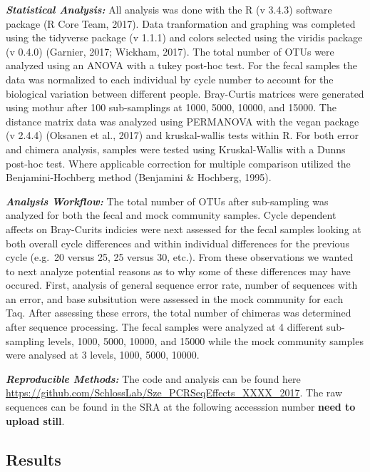 \documentclass[12pt,]{article}
\begin{document}
\textbf{\emph{Statistical Analysis:}} All analysis was done with the R
(v 3.4.3) software package (R Core Team, 2017). Data tranformation and
graphing was completed using the tidyverse package (v 1.1.1) and colors
selected using the viridis package (v 0.4.0) (Garnier, 2017; Wickham,
2017). The total number of OTUs were analyzed using an ANOVA with a
tukey post-hoc test. For the fecal samples the data was normalized to
each individual by cycle number to account for the biological variation
between different people. Bray-Curtis matrices were generated using
mothur after 100 sub-samplings at 1000, 5000, 10000, and 15000. The
distance matrix data was analyzed using PERMANOVA with the vegan package
(v 2.4.4) (Oksanen et al., 2017) and kruskal-wallis tests within R. For
both error and chimera analysis, samples were tested using
Kruskal-Wallis with a Dunns post-hoc test. Where applicable correction
for multiple comparison utilized the Benjamini-Hochberg method
(Benjamini \& Hochberg, 1995).

\textbf{\emph{Analysis Workflow:}} The total number of OTUs after
sub-sampling was analyzed for both the fecal and mock community samples.
Cycle dependent affects on Bray-Curits indicies were next assessed for
the fecal samples looking at both overall cycle differences and within
individual differences for the previous cycle (e.g.~20 versus 25, 25
versus 30, etc.). From these observations we wanted to next analyze
potential reasons as to why some of these differences may have occured.
First, analysis of general sequence error rate, number of sequences with
an error, and base subsitution were assessed in the mock community for
each Taq. After assessing these errors, the total number of chimeras was
determined after sequence processing. The fecal samples were analyzed at
4 different sub-sampling levels, 1000, 5000, 10000, and 15000 while the
mock community samples were analysed at 3 levels, 1000, 5000, 10000.

\textbf{\emph{Reproducible Methods:}} The code and analysis can be found
here \url{https://github.com/SchlossLab/Sze_PCRSeqEffects_XXXX_2017}.
The raw sequences can be found in the SRA at the following accesssion
number \textbf{need to upload still}.

\newpage

\subsection{Results}\label{results}
\end{document}
